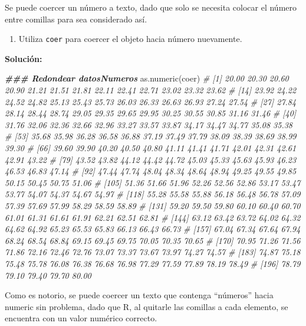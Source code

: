 \documentclass[
]{article}
\newenvironment{Shaded}{\begin{snugshade}}{\end{snugshade}}
\newcommand{\CommentTok}[1]{\textcolor[rgb]{0.56,0.35,0.01}{\textit{#1}}}
\newcommand{\DocumentationTok}[1]{\textcolor[rgb]{0.56,0.35,0.01}{\textbf{\textit{#1}}}}
\newcommand{\FunctionTok}[1]{\textcolor[rgb]{0.00,0.00,0.00}{#1}}
\newcommand{\NormalTok}[1]{#1}
\providecommand{\tightlist}{%
  \setlength{\itemsep}{0pt}\setlength{\parskip}{0pt}}
\theoremstyle{definition}
\theoremstyle{definition}
\theoremstyle{definition}
\theoremstyle{definition}
\theoremstyle{remark}
\begin{document}
Se puede coercer un número a texto, dado que solo se necesita colocar el número entre comillas para sea considerado así.

\begin{enumerate}
\def\labelenumi{\arabic{enumi}.}
\tightlist
\item
  Utiliza \texttt{coer} para coercer el objeto hacia número nuevamente.
\end{enumerate}

\textbf{Solución:}

\begin{Shaded}
\begin{Highlighting}[]
\DocumentationTok{\#\#\# Redondear datosNumeros}
\FunctionTok{as.numeric}\NormalTok{(coer)}
\CommentTok{\#   [1] 20.00 20.30 20.60 20.90 21.21 21.51 21.81 22.11 22.41 22.71 23.02 23.32 23.62}
\CommentTok{\#  [14] 23.92 24.22 24.52 24.82 25.13 25.43 25.73 26.03 26.33 26.63 26.93 27.24 27.54}
\CommentTok{\#  [27] 27.84 28.14 28.44 28.74 29.05 29.35 29.65 29.95 30.25 30.55 30.85 31.16 31.46}
\CommentTok{\#  [40] 31.76 32.06 32.36 32.66 32.96 33.27 33.57 33.87 34.17 34.47 34.77 35.08 35.38}
\CommentTok{\#  [53] 35.68 35.98 36.28 36.58 36.88 37.19 37.49 37.79 38.09 38.39 38.69 38.99 39.30}
\CommentTok{\#  [66] 39.60 39.90 40.20 40.50 40.80 41.11 41.41 41.71 42.01 42.31 42.61 42.91 43.22}
\CommentTok{\#  [79] 43.52 43.82 44.12 44.42 44.72 45.03 45.33 45.63 45.93 46.23 46.53 46.83 47.14}
\CommentTok{\#  [92] 47.44 47.74 48.04 48.34 48.64 48.94 49.25 49.55 49.85 50.15 50.45 50.75 51.06}
\CommentTok{\# [105] 51.36 51.66 51.96 52.26 52.56 52.86 53.17 53.47 53.77 54.07 54.37 54.67 54.97}
\CommentTok{\# [118] 55.28 55.58 55.88 56.18 56.48 56.78 57.09 57.39 57.69 57.99 58.29 58.59 58.89}
\CommentTok{\# [131] 59.20 59.50 59.80 60.10 60.40 60.70 61.01 61.31 61.61 61.91 62.21 62.51 62.81}
\CommentTok{\# [144] 63.12 63.42 63.72 64.02 64.32 64.62 64.92 65.23 65.53 65.83 66.13 66.43 66.73}
\CommentTok{\# [157] 67.04 67.34 67.64 67.94 68.24 68.54 68.84 69.15 69.45 69.75 70.05 70.35 70.65}
\CommentTok{\# [170] 70.95 71.26 71.56 71.86 72.16 72.46 72.76 73.07 73.37 73.67 73.97 74.27 74.57}
\CommentTok{\# [183] 74.87 75.18 75.48 75.78 76.08 76.38 76.68 76.98 77.29 77.59 77.89 78.19 78.49}
\CommentTok{\# [196] 78.79 79.10 79.40 79.70 80.00}
\end{Highlighting}
\end{Shaded}

Como es notorio, se puede coercer un texto que contenga ``números'' hacia numeric sin problema, dado que R, al quitarle las comillas a cada elemento, se encuentra con un valor numérico correcto.
\end{document}
